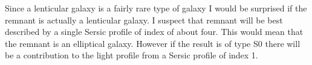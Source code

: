 \documentclass[fleqn,usenatbib]{mnras}
\begin{document}
 Since a lenticular galaxy is a fairly rare type of galaxy I would be surprised if the remnant is actually a lenticular galaxy. I suspect that remnant will be best described by a single Sersic profile of index of about four. This would mean that the remnant is an elliptical galaxy. However if the result is of type S0 there will be a contribution to the light profile from a Sersic profile of index 1. 







\end{document}
